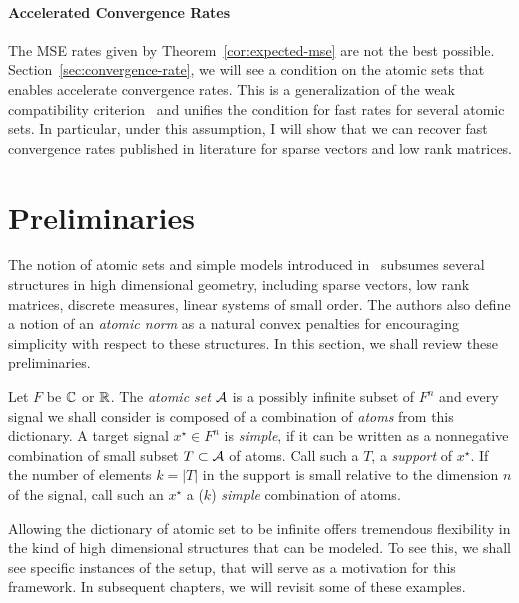 \paragraph*{Accelerated Convergence Rates} The MSE rates given by
Theorem~\ref{cor:expected-mse} are not the best possible. Section~\ref{sec:convergence-rate}, we will see a condition on the atomic sets
that enables accelerate convergence rates. This is a generalization of the weak
compatibility criterion~\cite{degeer} and unifies the condition for fast rates
for several atomic sets. In particular, under this assumption, I will show that
we can recover fast convergence rates published in literature for sparse vectors
and low rank matrices.


\section{Preliminaries}
\label{sec:ast:preliminaries}

The notion of atomic sets and simple models introduced in~\cite{crpw} subsumes
several structures in high dimensional geometry, including sparse
vectors, low rank matrices, discrete measures, linear systems of small order.
The authors also define a notion of an \emph{atomic norm} as a natural convex
penalties for encouraging simplicity with respect to these structures. In this
section, we shall review these preliminaries.

Let $F$ be $\mathbb{C}$ or $\mathbb{R}$. The \emph{atomic set} $\mathcal{A}$ is a possibly infinite
subset of $F^n$ and every signal we shall consider is composed of a combination
of \emph{atoms} from this dictionary. A target signal $x^\star \in F^n$ is
\emph{simple}, if it can be written as a nonnegative combination of small subset
$T \subset \mathcal{A}$ of atoms. Call such a $T$, a \emph{support} of $x^\star$. If the
number of elements $k = |T|$ in the support is small relative to the dimension
$n$ of the signal, call such an $x^\star$  a ($k$) \emph{simple} combination of
atoms.

Allowing the dictionary of atomic set to be infinite offers tremendous
flexibility in the kind of high dimensional structures that can be modeled. To
see this, we shall see specific instances of the setup, that will serve as a
motivation for this framework. In subsequent chapters, we will revisit some of
these examples.

